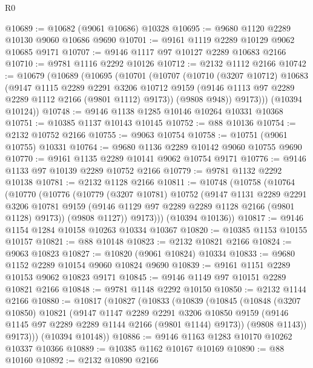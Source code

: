 \begin{lexlean}{R0}
\begin{coremodule}
@10689 := @10682 (@9061 @10686) @10328
@10695 := @9680 @1120 @2289 @10130 @9060 @10686 @9690
@10701 := @9161 @1119 @2289 @10129 @9062 @10685 @9171
@10707 := @9146 @1117 @97 @10127 @2289 @10683 @2166
@10710 := @9781 @1116 @2292 @10126
@10712 := @2132 @1112 @2166
@10742 := @10679
    (@10689
      (@10695
        (@10701
          (@10707
            (@10710
              (@3207 @10712)
              @10683
              (@9147
                @1115
                @2289
                @2291
                @3206
                @10712
                @9159
                (@9146 @1113 @97 @2289 @2289 @1112 @2166 (@9801 @1112) @9173))
              (@9808 @948))
            @9173)))
      (@10394 @10124))
@10748 := @9146 @1138 @1285 @10146 @10264 @10331 @10368
@10751 := @10385 @1137 @10143 @10145
@10752 := @88 @10136
@10754 := @2132 @10752 @2166
@10755 := @9063 @10754
@10758 := @10751 (@9061 @10755) @10331
@10764 := @9680 @1136 @2289 @10142 @9060 @10755 @9690
@10770 := @9161 @1135 @2289 @10141 @9062 @10754 @9171
@10776 := @9146 @1133 @97 @10139 @2289 @10752 @2166
@10779 := @9781 @1132 @2292 @10138
@10781 := @2132 @1128 @2166
@10811 := @10748
    (@10758
      (@10764
        (@10770
          (@10776
            (@10779
              (@3207 @10781)
              @10752
              (@9147
                @1131
                @2289
                @2291
                @3206
                @10781
                @9159
                (@9146 @1129 @97 @2289 @2289 @1128 @2166 (@9801 @1128) @9173))
              (@9808 @1127))
            @9173)))
      (@10394 @10136))
@10817 := @9146 @1154 @1284 @10158 @10263 @10334 @10367
@10820 := @10385 @1153 @10155 @10157
@10821 := @88 @10148
@10823 := @2132 @10821 @2166
@10824 := @9063 @10823
@10827 := @10820 (@9061 @10824) @10334
@10833 := @9680 @1152 @2289 @10154 @9060 @10824 @9690
@10839 := @9161 @1151 @2289 @10153 @9062 @10823 @9171
@10845 := @9146 @1149 @97 @10151 @2289 @10821 @2166
@10848 := @9781 @1148 @2292 @10150
@10850 := @2132 @1144 @2166
@10880 := @10817
    (@10827
      (@10833
        (@10839
          (@10845
            (@10848
              (@3207 @10850)
              @10821
              (@9147
                @1147
                @2289
                @2291
                @3206
                @10850
                @9159
                (@9146 @1145 @97 @2289 @2289 @1144 @2166 (@9801 @1144) @9173))
              (@9808 @1143))
            @9173)))
      (@10394 @10148))
@10886 := @9146 @1163 @1283 @10170 @10262 @10337 @10366
@10889 := @10385 @1162 @10167 @10169
@10890 := @88 @10160
@10892 := @2132 @10890 @2166

\end{coremodule}
\end{lexlean}
